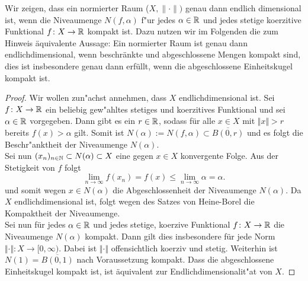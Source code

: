 
Wir zeigen, dass ein normierter Raum ($X, \lVert\cdot\rVert)$ genau dann endlich
dimensional ist, wenn die Niveaumenge
$N(f,\alpha)$ f"ur jedes $\alpha\in\mathbb{R}$ und
jedes stetige koerzitive Funktional
$f\colon X\to\mathbb{R}$ kompakt ist. Dazu
nutzen wir im Folgenden die zum Hinweis äquivalente Aussage: Ein normierter Raum ist genau dann endlichdimensional, wenn beschränkte und abgeschlossene Mengen kompakt sind,
dies ist insbesondere genau dann erfüllt, wenn die abgeschlossene Einheitskugel kompakt ist.

\begin{proof}
Wir wollen zun"achst annehmen, dass $X$ endlichdimensional ist. Sei $f\colon X\to\mathbb{R}$
ein beliebig gew"ahltes stetiges und koerzitives Funktional und sei $\alpha\in\mathbb{R}$
vorgegeben.
 Dann gibt es ein
 $r\in\mathbb{R}$, sodass für alle $x\in X$ mit $\Vert x\Vert>r$ bereits $f(x)>\alpha$ gilt. Somit ist $N(\alpha):=N(f,\alpha) \subset \overline{B(0,r)}$ und es folgt die
 Beschr"anktheit der Niveaumenge $N(\alpha)$.\\

 Sei nun $(x_n)_{n\in\mathbb{N}}\subset N(\alpha)\subset X$ eine gegen $x\in X$ konvergente Folge. Aus der Stetigkeit von $f$ folgt
 \begin{displaymath}
  \lim_{n\to\infty} f(x_n) = f(x) \le \lim_{n\to\infty} \alpha =\alpha.
 \end{displaymath}
und somit wegen $x\in N(\alpha)$ die Abgeschlossenheit der Niveaumenge $N(\alpha)$. Da $X$ endlichdimensional ist,
folgt wegen des Satzes von Heine-Borel die
Kompaktheit der Niveaumenge.\\

Sei nun für jedes $\alpha\in \mathbb{R}$ und jedes stetige, koerzive Funktional $f\colon X\to\mathbb{R}$ die Niveaumenge $N(\alpha)$ kompakt. Dann gilt
dies insbesondere für jede Norm $\Vert\cdot\Vert: X\to [0,\infty)$.
Dabei ist $\Vert\cdot\Vert$ offensichtlich koerziv und stetig. Weiterhin ist $N(1)=\overline{B(0,1)}$ nach Voraussetzung kompakt.
Dass die abgeschlossene Einheitskugel kompakt ist, ist äquivalent zur Endlichdimensionalit"at von $X$.
\end{proof}
